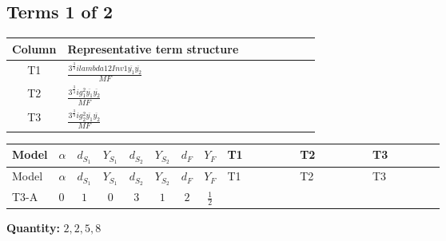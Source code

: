\documentclass[8pt]{article}
\begin{document}
\begin{landscape}
\subsection*{Terms 1 of 2}
\begin{center}
\begin{tabular}{@{}c >{\raggedright\arraybackslash}p{0.82\linewidth}@{}}
\toprule
Column & Representative term structure \\
\midrule
T1 & \(\displaystyle \frac{3^{\frac{3}{4}} i lambda12Inv1 \overline{y_{1}} \overline{y_{2}}}{MF}\) \\
\midrule
T2 & \(\displaystyle \frac{3^{\frac{3}{4}} i g_{1}^{2} \overline{y_{1}} \overline{y_{2}}}{MF}\) \\
\midrule
T3 & \(\displaystyle \frac{3^{\frac{3}{4}} i g_{2}^{2} \overline{y_{1}} \overline{y_{2}}}{MF}\) \\
\midrule
\bottomrule
\end{tabular}
\end{center}
\smallskip
\tiny
\begin{longtable}{@{}llcccccc >{\raggedright\arraybackslash}p{0.21\linewidth} >{\raggedright\arraybackslash}p{0.21\linewidth} >{\raggedright\arraybackslash}p{0.21\linewidth}@{}}
\toprule
Model & $\alpha$ & $d_{S_1}$ & $Y_{S_1}$ & $d_{S_2}$ & $Y_{S_2}$ & $d_F$ & $Y_F$ & T1 & T2 & T3 \\
\midrule
\endfirsthead
\toprule
Model & $\alpha$ & $d_{S_1}$ & $Y_{S_1}$ & $d_{S_2}$ & $Y_{S_2}$ & $d_F$ & $Y_F$ & T1 & T2 & T3 \\
\midrule
\endhead
T3-A & $0$ & $1$ & $0$ & $3$ & $1$ & $2$ & $\frac{1}{2}$ & \scriptsize\adjustbox{max width=\linewidth}{$\begin{gathered} \frac{3^{\frac{3}{4}} i lambda12Inv1 \overline{y_{1}} \overline{y_{2}}}{6 MF}\end{gathered}$} & \scriptsize\adjustbox{max width=\linewidth}{$\begin{gathered} \frac{3^{\frac{3}{4}} i g_{1}^{2} \overline{y_{1}} \overline{y_{2}}}{8 MF}\end{gathered}$} & \scriptsize\adjustbox{max width=\linewidth}{$\begin{gathered} \frac{17 \cdot 3^{\frac{3}{4}} i g_{2}^{2} \overline{y_{1}} \overline{y_{2}}}{24 MF}\end{gathered}$} \\
\midrule
\bottomrule
\end{longtable}
\clearpage
\noindent\textbf{Quantity: }$\mathrm{2,2,5,8}$\par\smallskip

\end{landscape}
\end{document}
